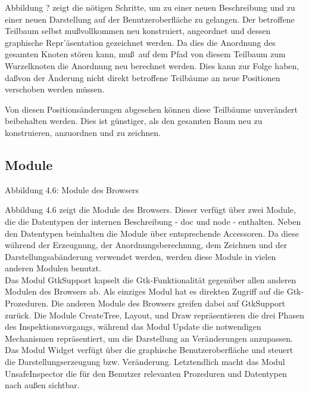 \documentclass[12pt,a4paper]{article}
\begin{document}
Abbildung ? zeigt die n\"otigen Schritte, um zu einer 
neuen Beschreibung und zu einer neuen Darstellung 
auf der Benutzeroberfl\"ache zu gelangen. 
Der betroffene Teilbaum selbst mu\ss vollkommen neu konstruiert, 
angeordnet und dessen graphische Repr'\"asentation 
gezeichnet werden. Da dies die Anordnung des 
gesamten Knoten st\"{o}ren kann, mu\ss \, auf dem Pfad von 
diesem Teilbaum zum 
Wurzelknoten die Anordnung neu berechnet werden. Dies kann 
zur Folge haben, da\ss  von der \"{A}nderung nicht direkt 
betroffene Teilb\"{a}ume an neue Positionen verschoben 
werden m\"{u}ssen. 

Von diesen Positions\"{a}nderungen 
abgesehen k\"{o}nnen diese Teilb\"{a}ume unver\"{a}ndert 
beibehalten werden. Dies ist g\"{u}nstiger, als den gesamten 
Baum neu zu konstruieren, anzuordnen und zu zeichnen.   
 

\subsection{Module}

\begin{center}
\linebreak Abbildung 4.6: Module des Browsers
\end{center}

Abbildung 4.6 zeigt die Module des Browsers.
Dieser verf\"{u}gt \"{u}ber zwei Module, die 
die Datentypen der internen Beschreibung  - doc und node - enthalten. 
Neben den Datentypen beinhalten die Module \"{u}ber 
entsprechende Accessoren.
Da diese w\"{a}hrend der 
Erzeugnung, der Anordnungsberechnung, dem Zeichnen 
und der Darstellungsab\"{a}nderung verwendet werden, 
werden diese Module in vielen anderen Modulen benutzt.\\
Das Modul GtkSupport kapselt die Gtk-Funktionalit\"{a}t 
gegen\"{u}ber allen anderen Modulen des Browsers ab. 
Als einziges Modul hat es direkten Zugriff auf die 
Gtk-Prozeduren. Die anderen Module des Browsers 
greifen dabei auf GtkSupport zur\"{u}ck.
Die Module CreateTree, Layout, und Draw repr\"{a}sentieren 
die drei Phasen des Inspektionsvorgangs, w\"ahrend das Modul 
Update die notwendigen Mechanismen repr\"asentiert, 
um die Darstellung an Ver\"{a}nderungen anzupassen. 
Das Modul Widget verf\"{u}gt \"{u}ber die 
graphische Benutzeroberfl\"{a}che und steuert 
die Darstellungserzeugung bzw. Ver\"{a}nderung. 
Letztendlich macht das Modul UnsafeInspector die f\"{u}r den 
Benutzer relevanten Prozeduren und Datentypen nach au\ss en sichtbar.
\end{document}
